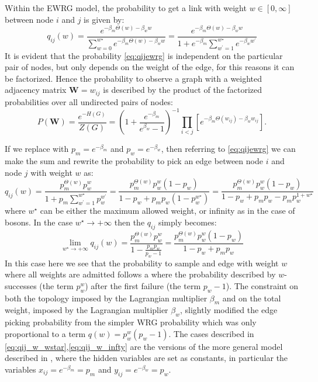 \documentclass[a4paper]{article}
\begin{document}
\noindent Within the EWRG model, the probability to get a link with weight $w \in [0,\infty]$ between node $i$ and $j$ is given by:
\begin{equation}\label{eq:qijewrg}
q_{ij}(w) = \dfrac{e^{-\beta_m \Theta(w) - \beta_w w}}{\sum_{w=0}^{w^\star} e^{-\beta_m \Theta(w) - \beta_w w}} = \dfrac{e^{-\beta_m \Theta(w) - \beta_w w}}{1+e^{-\beta_m}\sum_{w^\prime=1}^{w^\star} e^{-\beta_w w^\prime}}
\end{equation}
It is evident that the probability \ref{eq:qijewrg} is independent on the particular pair of nodes, but only depends on the weight of the edge, for this reasons it can be factorized. Hence the probability to observe a graph with a weighted adjacency matrix $\mathbf{W}=w_{ij}$ is described by the product of the factorized probabilities over all undirected pairs of nodes:
\begin{equation}
P(\mathbf{W}) = \dfrac{e^{-H(G)}}{Z(G)} = \left( 1 + \frac{e^{-\beta_m}}{e^{\beta_w}-1} \right)^{-1} \prod \limits_{i<j} \left[ e^{-\beta_m \Theta(w_{ij})-\beta_w w_{ij}} \right].
\end{equation}

If we replace with $p_m=e^{-\beta_m}$ and $p_w=e^{-\beta_w}$, then referring to \ref{eq:qijewrg} we can make the sum and rewrite the probability to pick an edge between node $i$ and node $j$ with weight $w$ as:
\begin{equation}\label{eq:qij_w_wstar}
q_{ij}(w) = \frac{p_m^{\Theta(w)} p_w^w}{1 + p_m \sum_{w^\prime=1}^{w^\star}p_w^{w^\prime}} = \frac{p_m^{\Theta(w)} p_w^w(1-p_w)}{1-p_w+p_m p_w(1-p_w^{w^\star})} = \frac{p_m^{\Theta(w)} p_w^w(1-p_w)}{1-p_w+p_m p_w - p_m p_w^{1+w^\star}}
\end{equation}
where $w^\star$ can be either the maximum allowed weight, or infinity as in the case of bosons. In the case $w^\star \rightarrow + \infty$ then the $q_{ij}$ simply becomes:
\begin{equation}\label{eq:qij_w_infty}
\lim_{w^\star \rightarrow +\infty} q_{ij}(w) = \frac{p_m^{\Theta(w)} p_w^w}{1-\frac{p_m p_w}{p_w-1}} = \frac{p_m^{\Theta(w)}p_w^w(1-p_w)}{1 -p_w + p_m p_w}
\end{equation}
In this case here we see that the probability to sample and edge with weight $w$ where all weights are admitted follows a where the probability described by $w$-successes (the term $p_w^w$) after the first failure (the term $p_w-1$).
The constraint on both the topology imposed by the Lagrangian multiplier $\beta_m$ and on the total weight, imposed by the Lagrangian multiplier $\beta_w$, slightly modified the edge picking probability from the simpler WRG probability which was only proportional to a term $q(w) = p_w^w(p_w-1)$. The cases described in \ref{eq:qij_w_wstar},\ref{eq:qij_w_infty} are the versions of the more general model described in \cite{Garlaschelli2009a}, where the hidden variables are set as constants, in particular the variables $x_{ij}=e^{-\beta_m}=p_m$ and $y_{ij}=e^{-\beta_w}=p_w$.
\end{document}
